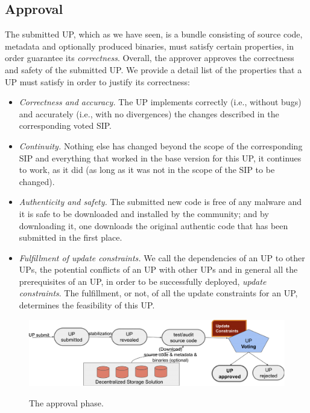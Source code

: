 \subsection{Approval} \label{appxapproval}
The submitted UP, which as we have seen, is a bundle consisting of source code, metadata and optionally produced binaries, must satisfy certain properties, in order guarantee its \emph{correctness}. Overall, the approver approves the correctness and safety of the submitted UP. We provide a detail list of the properties that a UP must satisfy in order to justify its correctness:

\begin{itemize}
\item
\emph{Correctness and accuracy.} The UP implements correctly (i.e., without bugs) and accurately (i.e., with no divergences) the changes described in the corresponding voted SIP.

\item \emph{Continuity.} Nothing else has changed beyond the scope of the corresponding SIP and everything that worked in the base version for this UP, it continues to work, as it did (as long as it was not in the scope of the SIP to be changed).

\item \emph{Authenticity and safety.} The submitted new code is free of any malware and it is safe to be downloaded and installed by the community; and by downloading it, one downloads the original authentic code that has been submitted in the first place.

\item \emph{Fulfillment of update constraints.} We call the dependencies of an UP to other UPs, the potential conflicts of an UP with other UPs and in general all the prerequisites of an UP, in order to be successfully deployed, \emph{update constraints}. The fulfillment, or not, of all the update constraints for an UP, determines the feasibility of this UP.
\end{itemize}

\begin{figure}[h!] %
    \centering
    \includegraphics[width=1.0 \columnwidth,keepaspectratio]{figures/approval_phase.pdf}
    \label{approval}
    \caption{The approval phase.}
\end{figure}

